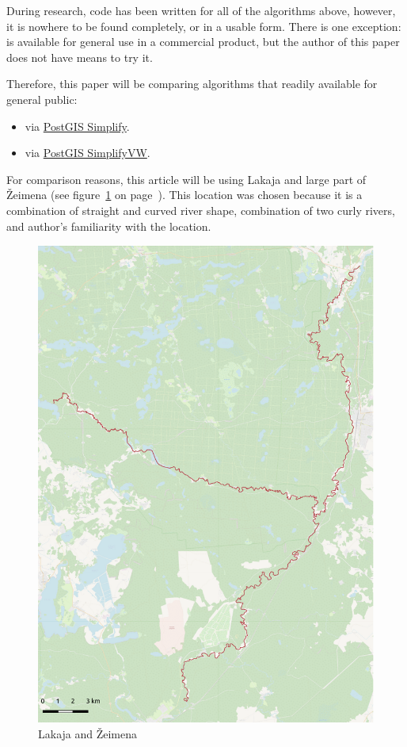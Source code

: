 \documentclass[a4paper]{article}
\begin{document}
During research, code has been written for all of the algorithms above,
however, it is nowhere to be found completely, or in a usable form. There is
one exception: \cite{wang1998line} is available for general use in a commercial
product, but the author of this paper does not have means to try it.

Therefore, this paper will be comparing algorithms that readily available for
general public:
\begin{itemize}
    \item \cite{douglas1973algorithms} via
        \href{https://postgis.net/docs/ST_Simplify.html}{PostGIS Simplify}.

    \item \cite{visvalingam1993line} via
        \href{https://postgis.net/docs/ST_SimplifyVW.html}{PostGIS SimplifyVW}.
\end{itemize}

For comparison reasons, this article will be using Lakaja and large part of Žeimena
(see figure~\ref{fig:zeimena} on page~\pageref{fig:zeimena}). This location was
chosen because it is a combination of straight and curved river shape,
combination of two curly rivers, and author's familiarity with the location.

\begin{figure}
    \centering
    \includegraphics[width=148mm]{zeimena-pretty}
    \caption{Lakaja and Žeimena}
    \label{fig:zeimena}
\end{figure}
\end{document}
